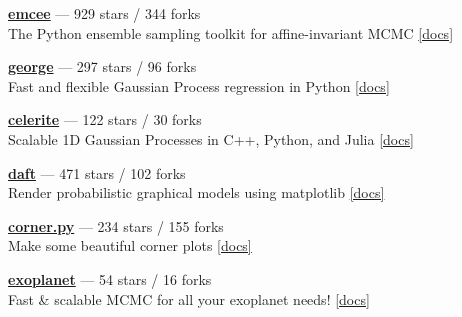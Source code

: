 \item \href{https://github.com/dfm/emcee}{{\bf emcee}} --- 929 stars / 344 forks \\
The Python ensemble sampling toolkit for affine-invariant MCMC \href{http://emcee.readthedocs.io}{[docs]}

\item \href{https://github.com/dfm/george}{{\bf george}} --- 297 stars / 96 forks \\
Fast and flexible Gaussian Process regression in Python \href{http://george.readthedocs.io}{[docs]}

\item \href{https://github.com/dfm/celerite}{{\bf celerite}} --- 122 stars / 30 forks \\
Scalable 1D Gaussian Processes in C++, Python, and Julia \href{http://celerite.rtfd.io}{[docs]}

\item \href{https://github.com/dfm/daft}{{\bf daft}} --- 471 stars / 102 forks \\
Render probabilistic graphical models using matplotlib \href{http://daft-pgm.org}{[docs]}

\item \href{https://github.com/dfm/corner.py}{{\bf corner.py}} --- 234 stars / 155 forks \\
Make some beautiful corner plots \href{http://corner.readthedocs.io}{[docs]}

\item \href{https://github.com/dfm/exoplanet}{{\bf exoplanet}} --- 54 stars / 16 forks \\
Fast {\&} scalable MCMC for all your exoplanet needs!  \href{https://exoplanet.dfm.io}{[docs]}